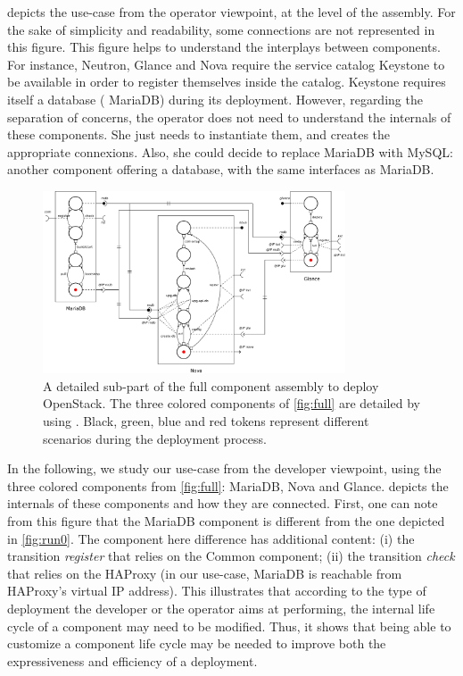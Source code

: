  depicts the use-case from the operator viewpoint, at the level
of the \mad assembly. For the sake of simplicity and readability, some
connections are not represented in this figure. This figure helps to understand
the interplays between components. For instance, Neutron, Glance and
Nova require the service catalog Keystone to be available in order to register
themselves inside the catalog. Keystone requires itself a database (\ie
MariaDB) during its deployment.
However, regarding the separation of concerns, the operator does not need to
understand the internals of these components. She just needs to instantiate
them, and creates the appropriate connexions. Also, she could decide to replace
MariaDB with MySQL: another component offering a database, with the same
interfaces as MariaDB.

\begin{figure}[t]
  \begin{center}
    \includegraphics[width=0.8\textwidth]{./images/sub.pdf}
    \caption{A detailed sub-part of the full component assembly to deploy
    OpenStack. The three colored components of \cref{fig:full} are
    detailed by using \mad. Black, green, blue and red tokens represent
    different scenarios during the deployment process.}
    \label{fig:sub}
  \end{center}
\end{figure}

In the following, we study our use-case from the developer viewpoint, using the
three colored components from \cref{fig:full}: MariaDB, Nova and Glance. 
 depicts the internals of these components and how they are
connected.
%
First, one can note from this figure that the MariaDB component is different
from the one depicted in \cref{fig:run0}. The component here difference has
additional content: (i) the transition \emph{register} that relies on the Common
component; (ii) the transition \emph{check} that relies on the HAProxy (in our
use-case, MariaDB is reachable from HAProxy's virtual IP address).  This
illustrates that according to the type of deployment the developer or the
operator aims at performing, the internal life cycle of a component may need to
be modified. Thus, it shows that being able to customize a component life cycle
may be needed to improve both the expressiveness and efficiency of a deployment.


